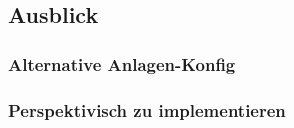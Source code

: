 \documentclass[onecolumn,10pt,titlepage]{article}
\begin{document}
\subsection{Ausblick}
\subsubsection{Alternative Anlagen-Konfig}
\subsubsection{Perspektivisch zu implementieren}
%		
\end{document}
